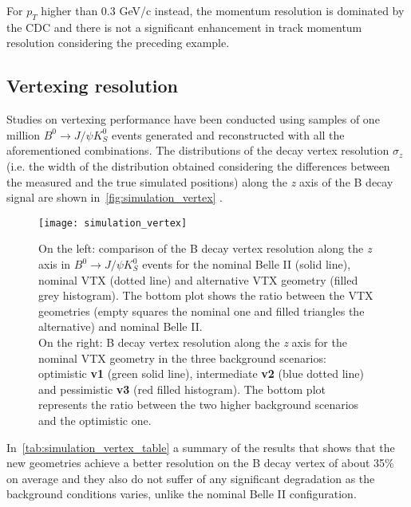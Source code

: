 For $p_{T}$ higher than 0.3 GeV/c instead, the momentum resolution is dominated by the CDC and there is not a significant enhancement in track momentum resolution considering the preceding example.

\subsection{Vertexing resolution}

Studies on vertexing performance have been conducted using samples of one million $B^{0} \rightarrow J/\psi K_{S}^{0}$ events generated and reconstructed with all the aforementioned combinations.
The distributions of the decay vertex resolution $\sigma_{z}$ (i.e. the width of the distribution obtained considering the differences between the measured and the true simulated positions) along the \textit{z} axis of the B decay signal are shown in~\autoref{fig:simulation_vertex} .

\begin{figure}[h!]
\centering
\texttt{[image: simulation\_vertex]}
\caption{On the left: comparison of the B decay vertex resolution along the \textit{z} axis in $B^{0} \rightarrow J/\psi K_{S}^{0}$ events for the nominal Belle II (solid line), nominal VTX (dotted line) and alternative VTX geometry (filled grey histogram). The bottom plot shows the ratio between the VTX geometries (empty squares the nominal one and filled triangles the alternative) and nominal Belle II. \\
On the right:  B decay vertex resolution along the \textit{z} axis for the nominal VTX geometry in the three background scenarios: optimistic \textbf{v1} (green solid line), intermediate \textbf{v2} (blue dotted line) and pessimistic \textbf{v3} (red filled histogram). The bottom plot represents the ratio between the two higher background scenarios and the optimistic one.}
\label{fig:simulation_vertex}
\end{figure}

In~\autoref{tab:simulation_vertex_table} a summary of the results that shows that the new geometries achieve a better resolution on the B decay vertex of about 35\% on average and they also do not suffer of any significant degradation as the background conditions varies, unlike the nominal Belle II configuration.

